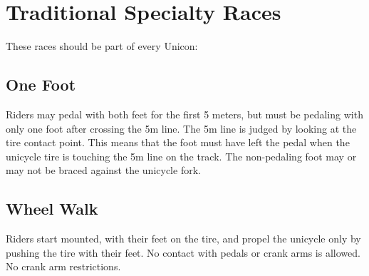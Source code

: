 \section{Traditional Specialty Races}
These races should be part of every Unicon:

\subsection{One Foot}
Riders may pedal with both feet for the first 5 meters, but must be pedaling with only one foot after crossing the 5m line.
The 5m line is judged by looking at the tire contact point.
This means that the foot must have left the pedal when the unicycle tire is touching the 5m line on the track.
The non-pedaling foot may or may not be braced against the unicycle fork.

\subsection{Wheel Walk}
Riders start mounted, with their feet on the tire, and propel the unicycle only by pushing the tire with their feet.
No contact with pedals or crank arms is allowed.
No crank arm restrictions.

